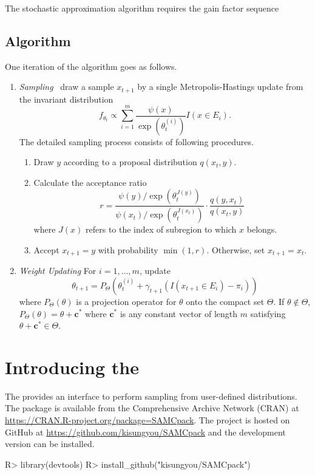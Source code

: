 \documentclass[article]{jss}
\newcommand{\vect}[1]{\boldsymbol{#1}}
\begin{document}
The stochastic approximation algorithm requires the gain factor sequence

\subsection{Algorithm}
One iteration of the algorithm goes as follows.
\begin{enumerate}
    \item \textit{Sampling}~ draw a sample $x_{t+1}$ by a single Metropolis-Hastings update from the invariant distribution
    \begin{equation}
        f_{\theta_t} \propto \sum_{i=1}^m \frac{\psi(x)}{\exp(\theta_t^{(i)})} I(x\in E_i).
    \end{equation}
    The detailed sampling process consists of following procedures.
    \begin{enumerate}
        \item Draw $y$ according to a proposal distribution $q(x_t,y)$.
        \item Calculate the acceptance ratio
        \begin{equation}
            r = \frac{\psi(y)/\exp(\theta_t^{J(y)})}{\psi(x_t)/\exp(\theta_t^{J(x_t)})} \cdot \frac{q(y,x_t)}{q(x_t,y)}
        \end{equation}
        where $J(x)$ refers to the index of subregion to which $x$ belongs.
        \item Accept $x_{t+1}=y$ with probability $\min(1,r)$. Otherwise, set $x_{t+1}=x_t$.
    \end{enumerate}
    \item \textit{Weight Updating} For $i=1,\ldots,m$, update 
    \begin{equation}
        \theta_{t+1} = P_{\Theta} \left( \theta_t^{(i)} +\gamma_{t+1} (I(x_{t+1}\in E_i)-\pi_i)  \right)
    \end{equation}
    where $P_{\Theta}(\theta)$ is a projection operator for $\theta$ onto the compact set $\Theta$. If $\theta \not\in \Theta$, $P_{\Theta}(\theta) = \theta + \vect{c}^*$ where $\vect{c}^*$ is any constant vector of length $m$ satisfying $\theta + \vect{c}^* \in \Theta$.
\end{enumerate}
\section[Package]{Introducing the }
The  provides an  interface to perform sampling from 
user-defined distributions. The package is available from the Comprehensive  
Archive Network (CRAN) at \url{https://CRAN.R-project.org/package=SAMCpack}. The project is hosted on GitHub at \url{https://github.com/kisungyou/SAMCpack} and the development version can be installed.
%
\begin{CodeChunk}
\begin{CodeInput}
R> library(devtools)
R> install_github("kisungyou/SAMCpack")
\end{CodeInput}
\end{CodeChunk}
%
\end{document}
